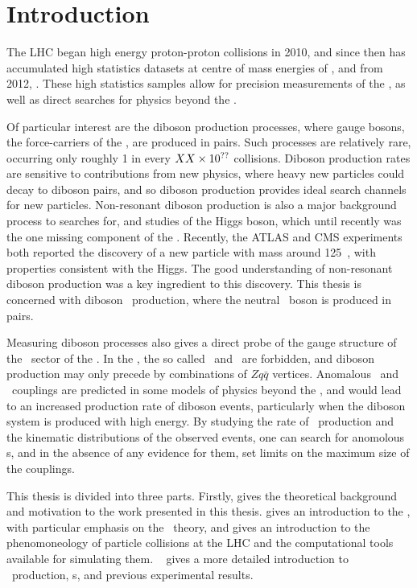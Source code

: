 \graphicspath{{Chapters/Introduction/Figures/}}

\chapter*{Introduction}
\label{chap:Introduction}

The LHC began high energy proton-proton collisions in 2010, and since then
has accumulated high statistics datasets at centre of mass energies of
, and from 2012, . These high statistics samples
allow for precision measurements of the \sm, as well as direct searches for
physics beyond the \sm. 

Of particular interest are the diboson production
processes, where gauge bosons, the force-carriers of the \sm, are produced in
pairs. Such processes are relatively rare, occurring only roughly 1 in every
$XX\times 10 ^{??}$ collisions. Diboson production rates are sensitive to
contributions from new physics, where heavy new particles could decay to diboson
pairs, and so diboson production provides ideal search channels for new
particles. Non-resonant diboson production is also a major background process to
searches for, and studies of the Higgs boson, which until recently was the one
missing component of the \sm. Recently, the ATLAS and CMS experiments both
reported the discovery of a new particle with mass around 125~\gev, with
properties consistent with the Higgs. The good understanding of non-resonant
diboson production was a key ingredient to this discovery. This thesis is
concerned with diboson \ZZ\ production, where the neutral \Z\ boson is produced
in pairs.

Measuring diboson processes also gives a direct probe of the gauge structure of
the \ew\ sector of the \sm. In the \sm, the so called  \ZZZ\ and \ZZg\ are forbidden, and diboson production may
only precede by combinations of $Zq\bar{q}$ vertices. Anomalous \ZZZ\ and \ZZg\ couplings are
predicted in some models of physics beyond the \sm, and would lead to an
increased production rate of diboson events, particularly when the diboson
system is produced with high energy. By studying the rate of \ZZ\ production and
the kinematic distributions of the observed events, one can search for anomolous
\TGC s, and in the absence of any evidence for them, set limits on the maximum
size of the couplings.

This thesis is divided into three parts. Firstly,  gives the theoretical background
and motivation to the work presented in this thesis.  gives an
introduction to the \sm, with particular emphasis on the \ew\ theory, and gives
an introduction to the phenomoneology of particle collisions at the LHC and the
computational tools available for simulating them. ~ gives a more
detailed introduction to \ZZ\ production, \TGC s, and previous experimental
results.

